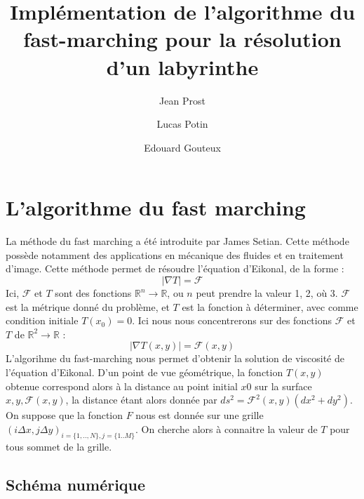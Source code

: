 \documentclass{article}
\title{Implémentation de l'algorithme du fast-marching pour la résolution d'un labyrinthe}
\author{Jean Prost \and Lucas Potin \and Edouard Gouteux}
\begin{document}
	
\maketitle
	
\section{L'algorithme du fast marching}

La méthode du fast marching a été introduite par James Setian. Cette méthode possède notamment des applications en mécanique des fluides et en traitement d'image. Cette méthode permet de résoudre l'équation d'Eikonal, de la forme :
\begin{equation}
|\nabla T|=\mathcal{F}
\end{equation}
Ici, $ \mathcal{F}$ et $T$ sont des fonctions $\mathbb{R}^n \to \mathbb{R}$, ou $n$ peut prendre la valeur 1, 2, où 3. $\mathcal{F}$ est la métrique donné du problème, et $T$ est la fonction à déterminer, avec comme condition initiale $T(x_0) = 0$. Ici nous nous concentrerons sur des fonctions $ \mathcal{F}$ et $T$ de $\mathbb{R}^2 \to \mathbb{R}$ :
\begin{equation}
|\nabla T(x,y)|=\mathcal{F}(x,y)
\end{equation}
L'algorihme du fast-marching nous permet d'obtenir la solution de viscosité de l'équation d'Eikonal.
D'un point de vue géométrique, la fonction $T(x,y)$ obtenue correspond alors à la distance au point initial $x0$ sur la surface ${x,y,\mathcal{F}(x,y)}$, la distance étant alors donnée par $ds^2=\mathcal{F}^2(x,y)(dx^2+dy^2)$. \\
On suppose que la fonction $F$ nous est donnée sur une grille $(i\Delta x,j\Delta y)_{i=\{1,..,N\},j=\{1..M\}}$. On cherche alors à connaitre la valeur de $T$ pour tous sommet de la grille.
\subsection{Schéma numérique}
\end{document}

